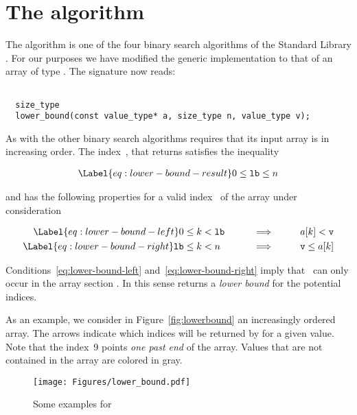 
\section{The \lowerbound algorithm}

The \lowerbound algorithm is one of the four binary search algorithms
of the \cxx Standard Library \cite[\S 28.7.3.1]{cxx-17-draft}.
For our purposes we have modified
the generic implementation
to that of an array of type .
The signature now reads:

\begin{lstlisting}[style = acsl-block]

  size_type
  lower_bound(const value_type* a, size_type n, value_type v);
\end{lstlisting}

As with the other binary search algorithms \lowerbound requires that
its input array is in increasing order.
The index~, that \lowerbound returns satisfies the inequality

\begin{align}
\Label{eq:lower-bound-result}
0 \leq \mathtt{lb} \leq n  
\end{align}

and has the following properties for a valid index~ of the array under consideration

\begin{alignat}{3}
\Label{eq:lower-bound-left}
0 &\leq k < \mathtt{lb} && \qquad\Longrightarrow\qquad && a[k] < \mathtt{v} \\
\Label{eq:lower-bound-right}
\mathtt{lb} &\leq k < n && \qquad\Longrightarrow\qquad && \mathtt{v} \leq a[k]
\end{alignat}

Conditions~\eqref{eq:lower-bound-left} and~\eqref{eq:lower-bound-right} imply that~
can only occur in the array section .
In this sense \lowerbound returns a \emph{lower bound} for the potential indices.

As an example, we consider in Figure~\ref{fig:lowerbound} an increasingly ordered array.
The arrows indicate which indices will be returned by \lowerbound for a given value.
Note that the index~9 points \emph{one past end} of the array.
Values that are not contained in the array are colored in gray.

\begin{figure}[hbt]
\centering
\texttt{[image: Figures/lower\_bound.pdf]}
\caption{Some examples for \lowerbound}
\end{figure}

